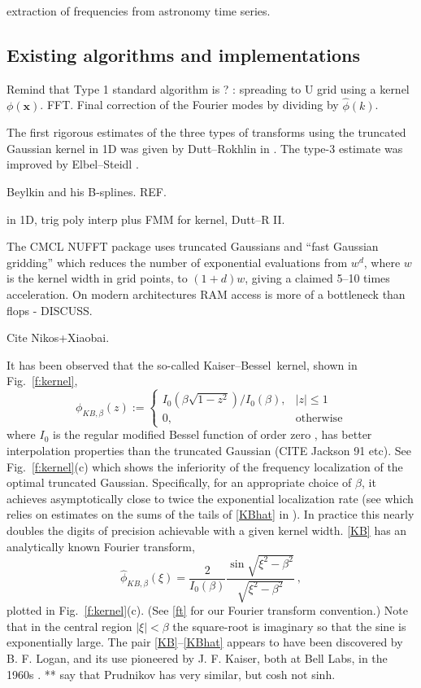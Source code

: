 \documentclass[10pt]{article}
\newcommand{\be}{\begin{equation}}
\newcommand{\ee}{\end{equation}}
\newcommand{\mbf}[1]{{\mathbf #1}}
\newcommand{\xx}{\mbf{x}}
\newcommand{\freq}{\beta}          %
\newcommand{\KB}{Kaiser--Bessel}
\begin{document}
extraction of frequencies from astronomy time series.





\subsection{Existing algorithms and implementations}

Remind that Type 1 standard algorithm is ? :
spreading to U grid using a kernel $\phi(\xx)$.
FFT.
Final correction of the Fourier modes by dividing by
$\hat\phi(k)$.

The first rigorous estimates of the three types of transforms
using the truncated Gaussian kernel in 1D was given by
Dutt--Rokhlin in \cite{dutt}.
The type-3 estimate was improved by Elbel--Steidl \cite{elbel}.


Beylkin and his B-splines. REF.

in 1D, trig poly interp plus FMM for kernel, Dutt--R II.

The CMCL NUFFT package \cite{cmcl} uses truncated Gaussians
and ``fast Gaussian gridding'' \cite[Sec.~3]{nufft}
which reduces the number of exponential evaluations
from $w^d$, where $w$ is the kernel width in grid points,
to $(1+d)w$, giving a claimed 5--10 times acceleration.
On modern architectures RAM access is more of a bottleneck than
flops - DISCUSS.

Cite Nikos+Xiaobai.

It has been observed that the so-called
\KB\ kernel, shown in Fig.~\ref{f:kernel},
\be
\phi_{KB,\freq}(z) := \left\{
\begin{array}{ll}I_0(\freq\sqrt{1-z^2}) / I_0(\freq), & |z|\le 1\\
  0,& \mbox{otherwise}\end{array}\right.
\label{KB}
\ee
where $I_0$ is the regular modified Bessel function of order zero
\cite[(10.25.2)]{dlmf}, has better interpolation
properties than the truncated Gaussian
(CITE Jackson 91 etc).
See Fig.~\ref{f:kernel}(c) which shows the inferiority of the
frequency localization of the optimal truncated Gaussian.
Specifically, for an appropriate choice of $\freq$, it achieves
asymptotically close to twice the exponential localization rate
(see \cite[p.19, (C.1) vs (C.4)]{nfft} which relies on
estimates on the sums of the tails of \eqref{KBhat}
in \cite{fourmontthesis,fourmont,pottshabil}).
In practice this nearly doubles the digits of precision achievable with
a given kernel width.
\eqref{KB} has an analytically known Fourier transform,
\be
\hat\phi_{KB,\freq}(\xi) = \frac{2}{I_0(\freq)}
\frac{\sin \sqrt{\xi^2-\freq^2}}{\sqrt{\xi^2-\freq^2}}
~,
\label{KBhat}
\ee
plotted in Fig.~\ref{f:kernel}(c).
(See \eqref{ft} for our Fourier transform convention.)
Note that in the central region $|\xi|<\freq$
the square-root is imaginary so that the sine is exponentially large.
The pair \eqref{KB}--\eqref{KBhat} appears to have been
discovered by B. F. Logan,
and its use pioneered by J. F. Kaiser, both at
Bell Labs, in the 1960s \cite{kaiser,kaiserinterview}.
** say that Prudnikov has very similar, but cosh not sinh.
\end{document}
